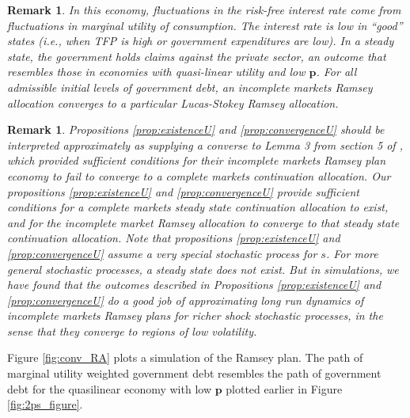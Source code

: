 \documentclass[12pt]{article}
\newcommand{\dge}[1]{\textcolor{blue}{$^{\textrm{dge}}${#1}}}
\newcommand{\tjs}[1]{\textcolor{red}{$^{\textrm{tjs}}${#1}}}
\newtheorem{remark}[theorem]{Remark}
\begin{document}
\begin{remark}
In this economy,  fluctuations in the risk-free  interest rate come from fluctuations in  marginal utility of consumption. The interest rate
 is low  in ``good'' states (i.e., when  TFP is high or government expenditures are low).
 In a steady state, the government holds claims against the private sector, an outcome that resembles those in economies
 with  quasi-linear utility and  low  $\bm{p}$.  For all admissible  initial  levels of government debt, an incomplete markets Ramsey allocation converges to a particular Lucas-Stokey  Ramsey allocation.

\end{remark}
{
\begin{remark}  Propositions \ref{prop:existenceU}  and \ref{prop:convergenceU} should be interpreted approximately as supplying  a converse to Lemma 3 from section 5 of \citet{Aiyagari2002}, which  provided sufficient conditions for their incomplete markets Ramsey plan  economy to {\em fail} to converge to  a complete markets continuation allocation.  Our propositions \ref{prop:existenceU}  and \ref{prop:convergenceU} provide sufficient conditions for a complete markets steady state continuation allocation to exist, and for the incomplete market Ramsey allocation to converge 
to that steady state continuation allocation.  %
Note that propositions \ref{prop:existenceU}  and \ref{prop:convergenceU} assume a very special stochastic process for $s$.
  For more general stochastic processes, a steady state does not exist. But in simulations,  we have found that the outcomes described in Propositions \ref{prop:existenceU}  and \ref{prop:convergenceU} do a good job of approximating long run  dynamics of incomplete markets Ramsey plans for
 richer shock stochastic processes, in the sense that they converge to regions of low volatility.
\end{remark}}
Figure \ref{fig:conv_RA} plots a simulation of the Ramsey plan.  The path of marginal utility weighted government debt resembles the path of government debt for the quasilinear economy with low $\bm p$ plotted earlier in Figure \ref{fig:2ps_figure}.
\end{document}
